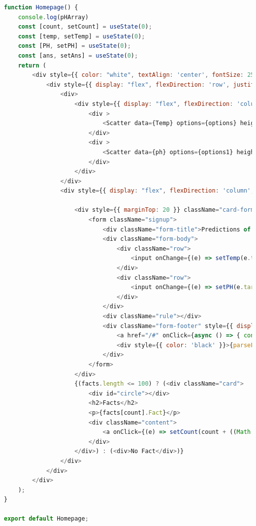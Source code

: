 \begin{lstlisting}[language=javascript, caption={Homepage of ML app}]
function Homepage() {
    console.log(pHArray)
    const [count, setCount] = useState(0);
    const [temp, setTemp] = useState(0);
    const [PH, setPH] = useState(0);
    const [ans, setAns] = useState(0);
    return (
        <div style={{ color: "white", textAlign: 'center', fontSize: 25 }}>Water Quality Model
            <div style={{ display: "flex", flexDirection: 'row', justifyContent: "space-around" }} className="container">
                <div>
                    <div style={{ display: "flex", flexDirection: 'column', justifyContent: "space-around" }}>
                        <div >
                            <Scatter data={Temp} options={options} height={300} width={400} />
                        </div>
                        <div >
                            <Scatter data={ph} options={options1} height={300} width={400} />
                        </div>
                    </div>
                </div>
                <div style={{ display: "flex", flexDirection: 'column', justifyContent: "space-between" }}>

                    <div style={{ marginTop: 20 }} className="card-form">
                        <form className="signup">
                            <div className="form-title">Predictions of D.O(mg/L)</div>
                            <div className="form-body">
                                <div className="row">
                                    <input onChange={(e) => setTemp(e.target.value)} type="text" placeholder="Water Temp (20-30)" />
                                </div>
                                <div className="row">
                                    <input onChange={(e) => setPH(e.target.value)} type="text" placeholder="Water pH" />
                                </div>
                            </div>
                            <div className="rule"></div>
                            <div className="form-footer" style={{ display: "flex", flexDirection: 'row' }}>
                                <a href="/#" onClick={async () => { console.log(await model(temp, PH, setAns)) }}>Calculate<span className="fa fa-ban"></span></a>
                                <div style={{ color: 'black' }}>{parseFloat(ans).toFixed(4)}</div>
                            </div>
                        </form>
                    </div>
                    {(facts.length <= 100) ? (<div className="card">
                        <div id="circle"></div>
                        <h2>Facts</h2>
                        <p>{facts[count].Fact}</p>
                        <div className="content">
                            <a onClick={(e) => setCount(count + ((Math.floor(Math.random() * 100))) - count)}>New Fact</a>
                        </div>
                    </div>) : (<div>No Fact</div>)}
                </div>
            </div>
        </div>
    );
}

export default Homepage;

\end{lstlisting}\\

